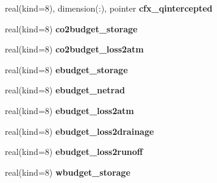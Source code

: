 \begin{DoxyCompactItemize}
\item 
\hypertarget{structrk4__coms_1_1rk4patchtype_ae8b6b83a4f53eb92605e473382eb2116}{
real(kind=8), dimension(:), pointer {\bfseries cfx\_\-qintercepted}}
\label{structrk4__coms_1_1rk4patchtype_ae8b6b83a4f53eb92605e473382eb2116}

\item 
\hypertarget{structrk4__coms_1_1rk4patchtype_aa7c6982ce419cd526a23e7a8ed6c3a65}{
real(kind=8) {\bfseries co2budget\_\-storage}}
\label{structrk4__coms_1_1rk4patchtype_aa7c6982ce419cd526a23e7a8ed6c3a65}

\item 
\hypertarget{structrk4__coms_1_1rk4patchtype_af0dfb98a6d25f6930335540f620fa56b}{
real(kind=8) {\bfseries co2budget\_\-loss2atm}}
\label{structrk4__coms_1_1rk4patchtype_af0dfb98a6d25f6930335540f620fa56b}

\item 
\hypertarget{structrk4__coms_1_1rk4patchtype_aa3f6b5b5a36b5d84273d929c78186db2}{
real(kind=8) {\bfseries ebudget\_\-storage}}
\label{structrk4__coms_1_1rk4patchtype_aa3f6b5b5a36b5d84273d929c78186db2}

\item 
\hypertarget{structrk4__coms_1_1rk4patchtype_a83c79518823b1f014a8877412f99ba42}{
real(kind=8) {\bfseries ebudget\_\-netrad}}
\label{structrk4__coms_1_1rk4patchtype_a83c79518823b1f014a8877412f99ba42}

\item 
\hypertarget{structrk4__coms_1_1rk4patchtype_a4d870f7c5aad41344d45b462e960a535}{
real(kind=8) {\bfseries ebudget\_\-loss2atm}}
\label{structrk4__coms_1_1rk4patchtype_a4d870f7c5aad41344d45b462e960a535}

\item 
\hypertarget{structrk4__coms_1_1rk4patchtype_a051cdaa0b1680b046d99ed9747e31e79}{
real(kind=8) {\bfseries ebudget\_\-loss2drainage}}
\label{structrk4__coms_1_1rk4patchtype_a051cdaa0b1680b046d99ed9747e31e79}

\item 
\hypertarget{structrk4__coms_1_1rk4patchtype_a8fc0d8ee10c1514c9ec0f1170dedab04}{
real(kind=8) {\bfseries ebudget\_\-loss2runoff}}
\label{structrk4__coms_1_1rk4patchtype_a8fc0d8ee10c1514c9ec0f1170dedab04}

\item 
\hypertarget{structrk4__coms_1_1rk4patchtype_a8353e7ef490e77bb14d49b4c6151e1d9}{
real(kind=8) {\bfseries wbudget\_\-storage}}
\label{structrk4__coms_1_1rk4patchtype_a8353e7ef490e77bb14d49b4c6151e1d9}


\end{DoxyCompactItemize}
